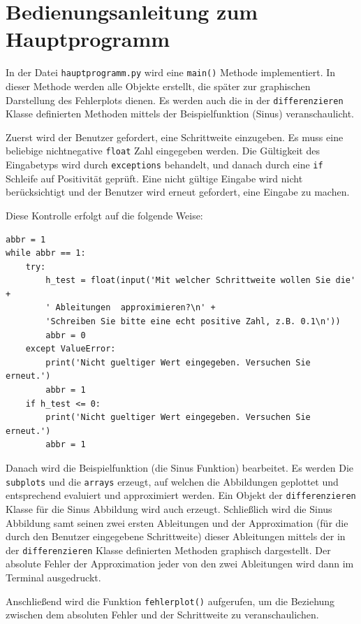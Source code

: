 \documentclass[smallheadings]{scrartcl}
\begin{document}
\section{Bedienungsanleitung zum Hauptprogramm}

In der Datei \texttt{hauptprogramm.py} wird eine \texttt{main()} Methode implementiert. In dieser Methode werden alle Objekte erstellt, die später zur graphischen Darstellung des Fehlerplots dienen. Es werden auch die in der \texttt{differenzieren} Klasse definierten Methoden mittels der Beispielfunktion (Sinus) veranschaulicht. 

Zuerst wird der Benutzer gefordert, eine Schrittweite einzugeben. Es muss eine beliebige nichtnegative \texttt{float} Zahl eingegeben werden. Die Gültigkeit des Eingabetyps wird durch \texttt{exceptions} behandelt, und danach durch eine \texttt{if} Schleife auf Positivität geprüft. Eine nicht gültige Eingabe wird nicht berücksichtigt  und der Benutzer wird erneut gefordert, eine Eingabe zu machen.

Diese Kontrolle erfolgt auf die folgende Weise:

\begin{lstlisting}
abbr = 1 
while abbr == 1: 
    try:
        h_test = float(input('Mit welcher Schrittweite wollen Sie die' + 
        ' Ableitungen  approximieren?\n' +
        'Schreiben Sie bitte eine echt positive Zahl, z.B. 0.1\n'))
        abbr = 0
    except ValueError:
        print('Nicht gueltiger Wert eingegeben. Versuchen Sie erneut.')
        abbr = 1
    if h_test <= 0:
        print('Nicht gueltiger Wert eingegeben. Versuchen Sie erneut.')
        abbr = 1
\end{lstlisting}

Danach wird die Beispielfunktion (die Sinus Funktion) bearbeitet. Es werden Die \texttt{subplots} und die \texttt{arrays} erzeugt, auf welchen die Abbildungen geplottet und entsprechend evaluiert und approximiert werden. Ein Objekt der \texttt{differenzieren} Klasse für die Sinus Abbildung wird auch erzeugt.  Schließlich wird die Sinus Abbildung samt seinen zwei ersten Ableitungen
und der Approximation (für die durch den Benutzer eingegebene Schrittweite) dieser Ableitungen mittels der in der \texttt{differenzieren} Klasse definierten Methoden graphisch dargestellt. Der absolute Fehler der Approximation jeder von den zwei Ableitungen wird dann im Terminal ausgedruckt. 

Anschließend wird die Funktion \texttt{fehlerplot()} aufgerufen, um die Beziehung zwischen dem absoluten Fehler und der Schrittweite zu veranschaulichen. 
\end{document}
